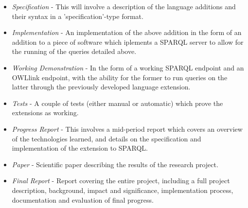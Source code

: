 \documentclass{article}
\begin{document}
\begin{itemize}
  \item \emph{Specification} - This will involve a description of the language additions 
  and their syntax in a 'specification'-type format. 
  \item \emph{Implementation} - An implementation of the above addition in the
  form of an addition to a piece of software which iplements a SPARQL server to
  allow for the running of the queries detailed above.
  \item \emph{Working Demonstration} - In the form of a working SPARQL endpoint
  and an OWLlink endpoint, with the ability for the former to run queries on the
  latter through the previously developed language extension.
  \item \emph{Tests} - A couple of tests (either manual or automatic) which
  prove the extensions as working.
  \item \emph{Progress Report} - This involves a mid-period report which covers
  an overview of the technologies learned, and details on the specification and 
  implementation of the extension to SPARQL.
  \item \emph{Paper} - Scientific paper describing the results of the research
  project.
  \item \emph{Final Report} - Report covering the entire project, including
  a full project description, background, impact and significance, 
  implementation process, documentation and evaluation of final progress.
\end{itemize}
\end{document}
